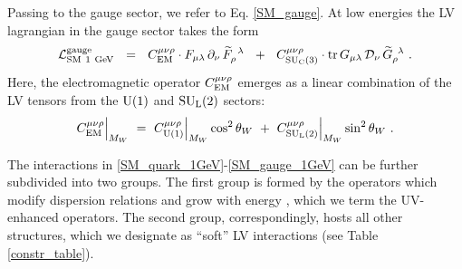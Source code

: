 \documentclass[12pt,preprintnumbers,nofootinbib]{revtex4}
\newcommand{\wt}{\widetilde}
\newcommand{\suc}{{{\rm SU}_{\rm C}(3)}}
\newcommand{\sul}{{{\rm SU}_{\rm L}(2)}}
\newcommand{\ue}{{{\rm U}(1)}}
\newcommand{\el}{{\rm EM}}
\begin{document}
	Passing to the gauge sector, we refer to Eq. \eqref{SM_gauge}.
	At low energies the LV lagrangian in the gauge sector
	takes the form
\begin{equation}
\label{SM_gauge_1GeV}
	\mathcal{L}_{\rm SM\ 1~GeV}^{\rm gauge} ~~=~~
	C^{\mu\nu\rho}_\el \cdot 
	F_{\mu\lambda}\, \partial_\nu\, \wt{F}_\rho^{\phantom{\rho}\lambda}
	~~+~~
	C_{\suc}^{\mu\nu\rho} \cdot 
	{\rm tr}\,
	G_{\mu\lambda}\, \mathcal{D}_\nu\, \wt{G}_\rho^{\phantom{\rho}\lambda}
	~.
\end{equation}
	Here, the electromagnetic operator
$ C^{\mu\nu\rho}_\el $
	emerges as a linear combination of the LV
	tensors from the $ \ue $ and $ \sul $ sectors:
\[
	C^{\mu\nu\rho}_\el\Bigr|_{M_W} ~=~ 
		C^{\mu\nu\rho}_{\ue}\Bigr|_{M_W} \cos^2 \theta_W ~+~ 
		C^{\mu\nu\rho}_{\sul}\Bigr|_{M_W} \sin^2 \theta_W~.
\]


	The interactions in \eqref{SM_quark_1GeV}-\eqref{SM_gauge_1GeV} 
	can be further subdivided into two groups.
	The first group is formed by the operators which modify dispersion relations
	and grow with energy \cite{MP:}, which we term the UV-enhanced operators.
	The second group, correspondingly, hosts all other
	structures, which we designate as ``soft'' LV interactions  
	(see Table \ref{constr_table}).
\end{document}
